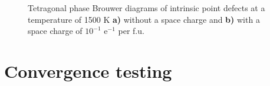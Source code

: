 \begin{figure}[ht!]
\begin{center}
		\caption{Tetragonal phase Brouwer diagrams of intrinsic point defects at a temperature of 1500 K \textbf{a)} without a space charge and \textbf{b)} with a space charge of $10^{-1}$ e$^{-1}$ per f.u.}
		\label{figure:spacechargeexample}
	\end{center}
\end{figure}

\section{Convergence testing} \label{section:convergence}

